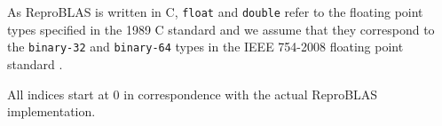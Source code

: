   As ReproBLAS is written in C, \texttt{float} and \texttt{double} refer to the
  floating point types specified in the 1989 C standard \cite{c89} and we
  assume that they correspond to the \texttt{binary-32} and \texttt{binary-64}
  types in the IEEE 754-2008 floating point standard \cite{ieee754}.

  All indices start at $0$ in correspondence with the actual ReproBLAS implementation.
